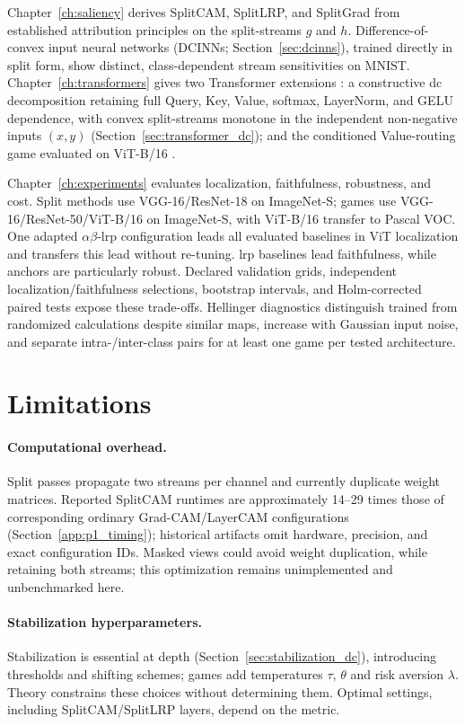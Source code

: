 Chapter~\ref{ch:saliency} derives SplitCAM, SplitLRP, and SplitGrad from established attribution principles on the split-streams $g$ and $h$. Difference-of-convex input neural networks (DCINNs; Section~\ref{sec:dcinns}), trained directly in split form, show distinct, class-dependent stream sensitivities on MNIST. Chapter~\ref{ch:transformers} gives two Transformer extensions \parencite{Vaswani2017}: a constructive \ac{dc} decomposition retaining full Query, Key, Value, softmax, LayerNorm, and GELU dependence, with convex split-streams monotone in the independent non-negative inputs $(x,y)$ (Section~\ref{sec:transformer_dc}); and the conditioned Value-routing game evaluated on ViT-B/16 \parencite{Dosovitskiy2021vit}.

Chapter~\ref{ch:experiments} evaluates localization, faithfulness, robustness, and cost. Split methods use VGG-16/ResNet-18 on ImageNet-S; games use VGG-16/ResNet-50/ViT-B/16 on ImageNet-S, with ViT-B/16 transfer to Pascal VOC. One adapted $\alpha\beta$-\ac{lrp} configuration leads all evaluated baselines in ViT localization and transfers this lead without re-tuning. \ac{lrp} baselines lead faithfulness, while anchors are particularly robust. Declared validation grids, independent localization/faithfulness selections, bootstrap intervals, and Holm-corrected paired tests expose these trade-offs. Hellinger diagnostics distinguish trained from randomized calculations despite similar maps, increase with Gaussian input noise, and separate intra-/inter-class pairs for at least one game per tested architecture.

\section{Limitations}\label{sec:limitations}

\paragraph{Computational overhead.} Split passes propagate two streams per channel and currently duplicate weight matrices. Reported SplitCAM runtimes are approximately 14--29 times those of corresponding ordinary Grad-CAM/LayerCAM configurations (Section~\ref{app:p1_timing}); historical artifacts omit hardware, precision, and exact configuration IDs. Masked views could avoid weight duplication, while retaining both streams; this optimization remains unimplemented and unbenchmarked here.

\paragraph{Stabilization hyperparameters.} Stabilization is essential at depth (Section~\ref{sec:stabilization_dc}), introducing thresholds and shifting schemes; games add temperatures $\tau$, $\theta$ and risk aversion $\lambda$. Theory constrains these choices without determining them. Optimal settings, including SplitCAM/SplitLRP layers, depend on the metric.


